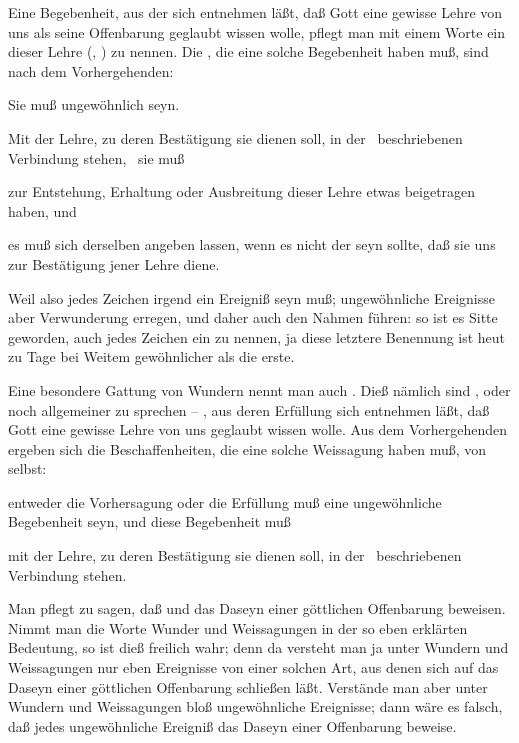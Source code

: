 Eine Begebenheit, aus der sich entnehmen läßt, daß Gott eine gewisse Lehre von uns als seine Offenbarung geglaubt wissen wolle, pflegt man mit einem Worte ein  dieser Lehre (, ) zu nennen. Die , die eine solche Begebenheit haben muß, sind nach dem Vorhergehenden:
\begin{aufzb}
\item Sie muß ungewöhnlich seyn.
\item Mit der Lehre, zu deren Bestätigung sie dienen soll, in der \ beschriebenen Verbindung stehen, \dh\ sie muß
\begin{aufzc}
\item zur Entstehung, Erhaltung oder Ausbreitung dieser Lehre etwas beigetragen haben, und
\item es muß sich  derselben angeben lassen, wenn es nicht der seyn sollte, daß sie uns zur Bestätigung jener Lehre diene.~
\end{aufzc} 
\end{aufzb}
Weil also jedes Zeichen irgend ein  Ereigniß seyn muß; ungewöhnliche Ereignisse aber Verwunderung erregen, und daher auch den Nahmen  führen: so ist es Sitte geworden, auch jedes Zeichen ein  zu nennen, ja diese letztere Benennung ist heut zu Tage bei Weitem gewöhnlicher als die erste.\par
Eine besondere Gattung von Wundern nennt man auch . Dieß nämlich sind , oder noch allgemeiner zu sprechen -- , aus deren Erfüllung sich entnehmen läßt, daß Gott eine gewisse Lehre von uns geglaubt wissen wolle. Aus dem Vorhergehenden ergeben sich die Beschaffenheiten, die eine solche Weissagung haben muß, von selbst:
\begin{aufzb}
\item entweder die Vorhersagung oder die Erfüllung muß eine ungewöhnliche Begebenheit seyn, und diese Begebenheit muß
\item mit der Lehre, zu deren Bestätigung sie dienen soll, in der \ beschriebenen Verbindung stehen.
\end{aufzb}
Man pflegt zu sagen, daß  und  das Daseyn einer göttlichen Offenbarung beweisen. Nimmt man die Worte Wunder und Weissagungen in der so eben erklärten Bedeutung, so ist dieß freilich wahr; denn da versteht man ja unter Wundern und Weissagungen nur eben Ereignisse von einer solchen Art, aus denen sich auf das Daseyn einer göttlichen Offenbarung schließen läßt. Verstände man aber unter Wundern und Weissagungen bloß ungewöhnliche Ereignisse; dann wäre es falsch, daß jedes ungewöhnliche Ereigniß das Daseyn einer Offenbarung beweise.

